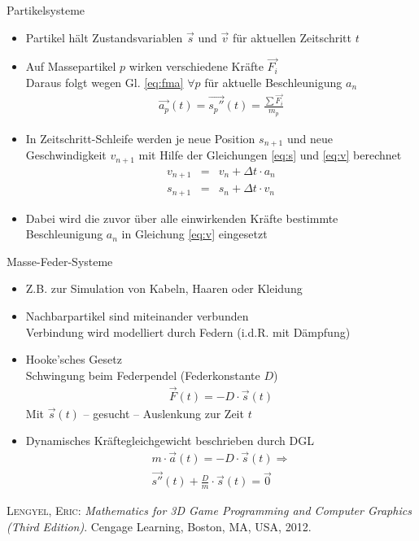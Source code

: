 \documentclass{beamer}
\begin{document}
\begin{frame}{Partikelsysteme}
   \begin{itemize}
        
        \item Partikel hält Zustandsvariablen $\vec{s}$ und $\vec{v}$ für aktuellen Zeitschritt $t$
        
        \item Auf Massepartikel $p$ wirken verschiedene Kräfte $\vec{F_i}$\\
        Daraus folgt wegen Gl. \ref{eq:fma} $\forall p$ für aktuelle Beschleunigung $a_n$
        \begin{align}
        \vec{a_p} (t) = \vec{s_p''} (t) = \frac{\sum{\vec{F_i}}}{m_p}
        \end{align}
        
        \item In Zeitschritt-Schleife werden je neue Position $s_{n+1}$ und neue Geschwindigkeit $v_{n+1}$
        mit Hilfe der Gleichungen \ref{eq:s} und \ref{eq:v} berechnet
        \begin{eqnarray}
        v_{n+1} &=& v_n + \Delta t \cdot a_n\\
        s_{n+1} &=& s_n + \Delta t \cdot v_n
        \end{eqnarray}
        
        \item Dabei wird die zuvor über alle einwirkenden Kräfte 
        bestimmte Beschleunigung $a_n$ in Gleichung \ref{eq:v} eingesetzt
    
       \end{itemize}
\end{frame}

\begin{frame}{Masse-Feder-Systeme}
   \begin{itemize}

    \item Z.B. zur Simulation von Kabeln, Haaren oder Kleidung
    \item Nachbarpartikel sind miteinander verbunden\\
    Verbindung wird modelliert durch Federn (i.d.R. mit Dämpfung)
    
    \item Hooke'sches Gesetz\\
    Schwingung beim Federpendel (Federkonstante $D$)
    \begin{align}
    \vec{F} (t) = -D \cdot \vec{s} (t)
    \end{align}
    Mit $\vec{s} (t)$ -- gesucht -- Auslenkung zur Zeit $t$

    \item Dynamisches Kräftegleichgewicht beschrieben durch DGL
    \begin{align}
    m \cdot \vec{a} (t) = -D \cdot \vec{s} (t) \Rightarrow \\
    \vec{s''} (t) + \frac{D}{m} \cdot \vec{s} (t) = \vec{0}
    \end{align}
    
    
  \end{itemize}
\end{frame}

\vfill

\begin{thebibliography}{Len12}
{\normalfont\scshape Lengyel, Eric}: {\em Mathematics for 3D Game Programming and Computer Graphics (Third Edition)}.
\newblock Cengage Learning, Boston, MA, USA, 2012.
\end{thebibliography}
\end{document}
